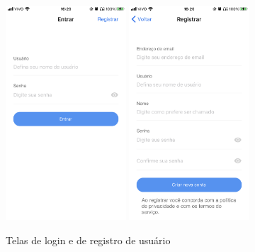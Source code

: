 \begin{figure}[htbp]
	\caption{\small Telas de login e de registro de usuário} 
	\begin{center}
		\includegraphics[height=8cm]{images/lazarus-sign-in.png} \quad
		\includegraphics[height=8cm]{images/lazarus-sign-up.png}
	\end{center}
	\label{f.lazarus-sign}
\end{figure}

